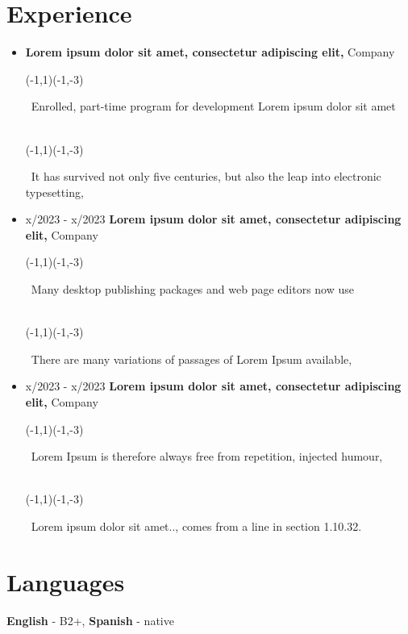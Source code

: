 \documentclass[letterpaper,9pt]{article}
\newcommand{\smalltextbullet}{\,\begin{picture}(-1,1)(-1,-3)\circle*{3}\end{picture}\ }
\newcommand{\phvfont}[1]{{\fontfamily{phv}\selectfont #1}}
\begin{document}
    \section{Experience}
    \begin{itemize}
        \item[]
        \phvfont{{3/2023 - x/2023}}
        \hspace*{6pt}
        {\textbf{Lorem ipsum dolor sit amet, consectetur adipiscing elit,}} \hfill 	Company
      \newline
      \hspace*{80pt}
        \smalltextbullet Enrolled, part-time program for development Lorem ipsum dolor sit amet \\
        \hspace*{80pt}
        \smalltextbullet It has survived not only five centuries, but also the leap into electronic typesetting,
        \item[]
        {x/2023 - x/2023}
        \hspace*{6pt}
        {\textbf{Lorem ipsum dolor sit amet, consectetur adipiscing elit,}}  \hfill Company
        \newline
        \hspace*{80pt}
        \smalltextbullet Many desktop publishing packages and web page editors now use  \\
        \hspace*{80pt}
        \smalltextbullet There are many variations of passages of Lorem Ipsum available,
      \item[]
        {x/2023 - x/2023}
        \hspace*{6pt}
        {\textbf{Lorem ipsum dolor sit amet, consectetur adipiscing elit,}}  \hfill		Company
        \newline
        \hspace*{80pt}
        \smalltextbullet Lorem Ipsum is therefore always free from repetition, injected humour,\\
        \hspace*{80pt}
        \smalltextbullet  Lorem ipsum dolor sit amet.., comes from a line in section 1.10.32.
    \end{itemize}
    
    \vspace{-10 pt}
	\phvfont{\section{Languages}}
    \hspace{26mm} 
    \phvfont{\textbf{English} - B2+, \textbf{ Spanish} - native}
    
\end{document}
